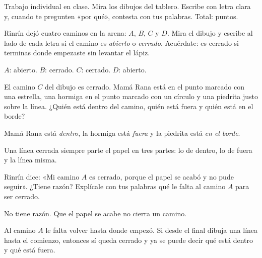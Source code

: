\documentclass[11pt]{article}
\begin{document}
\encabezado

\begin{instrucciones}
Trabajo individual en clase. Mira los dibujos del tablero. Escribe con letra clara y, cuando
te pregunten «por qué», contesta con tus palabras. Total: \totalpuntos{} puntos.
\end{instrucciones}

\begin{preguntas}

\pregunta[2] Rinrín dejó cuatro caminos en la arena: $A$, $B$, $C$ y $D$. Mira el dibujo y
escribe al lado de cada letra si el camino es \emph{abierto} o \emph{cerrado}. Acuérdate: es
cerrado si terminas donde empezaste sin levantar el lápiz.
\begin{solucion}[4cm]
$A$: abierto. \quad $B$: cerrado. \quad $C$: cerrado. \quad $D$: abierto.
\end{solucion}

\pregunta[2] El camino $C$ del dibujo es cerrado. Mamá Rana está en el punto marcado con una
estrella, una hormiga en el punto marcado con un círculo y una piedrita justo sobre la línea.
¿Quién está dentro del camino, quién está fuera y quién está en el borde?
\begin{solucion}[4cm]
Mamá Rana está \emph{dentro}, la hormiga está \emph{fuera} y la piedrita está \emph{en el
borde}.

Una línea cerrada siempre parte el papel en tres partes: lo de dentro, lo de fuera y la línea
misma.
\end{solucion}

\pregunta[1] Rinrín dice: «Mi camino $A$ es cerrado, porque el papel se acabó y no pude
seguir». ¿Tiene razón? Explícale con tus palabras qué le falta al camino $A$ para ser cerrado.
\begin{solucion}[3.5cm]
No tiene razón. Que el papel se acabe no cierra un camino.

Al camino $A$ le falta volver hasta donde empezó. Si desde el final dibuja una línea hasta el
comienzo, entonces sí queda cerrado y ya se puede decir qué está dentro y qué está fuera.
\end{solucion}

\end{preguntas}
\end{document}
